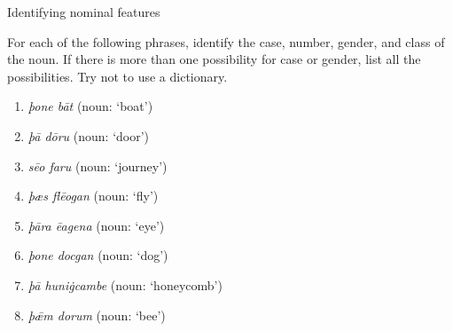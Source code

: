\largerpage[3]
\begin{exercises}{Identifying nominal features}\label{exercise-OE-nominalmorph}

For each of the following phrases, identify the case, number, gender, and class of the noun. If there is more than one possibility for case or gender, list all the possibilities. Try not to use a dictionary.

\begin{enumerate}
    \item \emph{þone bāt} (noun: `boat')
    \item \emph{þā dōru} (noun: `door')
    \item \emph{sēo faru} (noun: `journey')
    \item \emph{þæs flēogan} (noun: `fly')
    \item \emph{þāra ēagena} (noun: `eye')
    \item \emph{þone docgan} (noun: `dog')
    \item \emph{þā huniġcambe} (noun: `honeycomb')
    \item \emph{þǣm dorum} (noun: `bee')
\end{enumerate}

\end{exercises}

